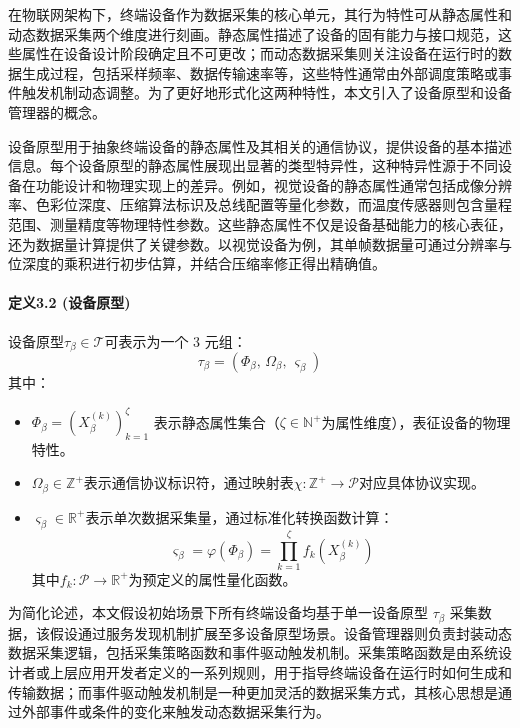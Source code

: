 在物联网架构下，终端设备作为数据采集的核心单元，其行为特性可从静态属性和动态数据采集两个维度进行刻画。静态属性描述了设备的固有能力与接口规范，这些属性在设备设计阶段确定且不可更改；而动态数据采集则关注设备在运行时的数据生成过程，包括采样频率、数据传输速率等，这些特性通常由外部调度策略或事件触发机制动态调整。为了更好地形式化这两种特性，本文引入了设备原型和设备管理器的概念。

设备原型用于抽象终端设备的静态属性及其相关的通信协议，提供设备的基本描述信息。每个设备原型的静态属性展现出显著的类型特异性，这种特异性源于不同设备在功能设计和物理实现上的差异。例如，视觉设备的静态属性通常包括成像分辨率、色彩位深度、压缩算法标识及总线配置等量化参数，而温度传感器则包含量程范围、测量精度等物理特性参数。这些静态属性不仅是设备基础能力的核心表征，还为数据量计算提供了关键参数。以视觉设备为例，其单帧数据量可通过分辨率与位深度的乘积进行初步估算，并结合压缩率修正得出精确值。

\paragraph{定义3.2 (设备原型)} 设备原型$\tau_\beta \in \mathcal{T}$可表示为一个 3 元组：
\[
\tau_\beta = (\Phi_\beta,\, \Omega_\beta,\, \varsigma_\beta)
\]
其中：
\begin{itemize}
    \item $\Phi_\beta = (X^{(k)}_\beta)_{k=1}^{\zeta}$ 表示静态属性集合（$\zeta \in \mathbb{N}^+$为属性维度），表征设备的物理特性。
    \item $\Omega_\beta \in \mathbb{Z}^+$表示通信协议标识符，通过映射表$\chi: \mathbb{Z}^+ \to \mathcal{P}$对应具体协议实现。
    \item $\varsigma_\beta \in \mathbb{R}^+$表示单次数据采集量，通过标准化转换函数计算：
        \[
        \varsigma_\beta = \varphi(\Phi_\beta) = \prod_{k=1}^{\zeta} f_k(X^{(k)}_\beta)
        \]
        其中$f_k: \mathcal{P} \to \mathbb{R}^+$为预定义的属性量化函数。
\end{itemize}

为简化论述，本文假设初始场景下所有终端设备均基于单一设备原型 $\tau_\beta$ 采集数据，该假设通过服务发现机制扩展至多设备原型场景。设备管理器则负责封装动态数据采集逻辑，包括采集策略函数和事件驱动触发机制。采集策略函数是由系统设计者或上层应用开发者定义的一系列规则，用于指导终端设备在运行时如何生成和传输数据；而事件驱动触发机制是一种更加灵活的数据采集方式，其核心思想是通过外部事件或条件的变化来触发动态数据采集行为。

